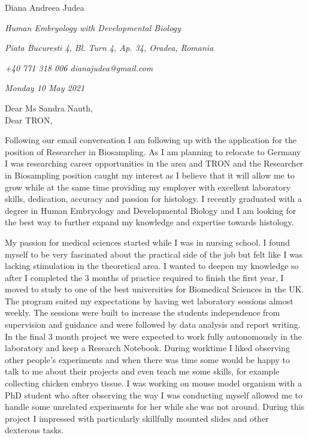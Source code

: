 \documentclass[paper=a4,fontsize=11pt]{scrartcl} %
\newcommand{\sepspace}{\vspace*{1em}}		%
\newcommand{\MyName}[1]{ %
  \Huge \usefont{OT1}{phv}{b}{n} \hfill #1
  \par \normalsize \normalfont}
\newcommand{\MyCoverSlogan}[4]{ %
  \large \usefont{OT1}{phv}{m}{n}\hfill \textit{#1} 
  \sepspace
  \par \normalsize \usefont{OT1}{phv}{m}{n}\hfill \textit{#2}
  \par \normalsize \usefont{OT1}{phv}{m}{n}\hfill \textit{#3}
  \par \normalsize \usefont{OT1}{phv}{m}{n}\hfill \textit{#4}
  \par \normalsize \normalfont}
\begin{document}
  
  \MyName{Diana Andreea Judea}
  \MyCoverSlogan{Human Embryology with Developmental Biology}{Piata Bucuresti 4, Bl.  Turn 4, Ap.  34, Oradea, Romania}{+40 771 318 006 \hspace{5pt} dianajudea@gmail.com}{Monday 10 May 2021}
  \sepspace %
  
  \noindent
  Dear Ms Sandra Nauth, \\
  Dear TRON,

  \sepspace 

  \noindent Following our email conversation I am following up with the
  application for the position of Researcher in Biosampling.  As I am planning
  to relocate to Germany I was researching career opportunities in the area and
  TRON and the Researcher in Biosampling position caught my interest as I
  believe that it will allow me to grow while at the same time providing my
  employer with excellent laboratory skills, dedication, accuracy and passion
  for histology.  I recently graduated with a degree in Human Embryology and
  Developmental Biology and I am looking for the best way to further expand my
  knowledge and expertise towards histology.

  \sepspace 

  \noindent My passion for medical sciences started while I was in nursing
  school.  I found myself to be very fascinated about the practical side of the
  job but felt like I was lacking stimulation in the theoretical area.  I
  wanted to deepen my knowledge so after I completed the 3 months of practice
  required to finish the first year, I moved to study to one of the best
  universities for Biomedical Sciences in the UK.  The program suited my
  expectations by having wet laboratory sessions almost weekly.  The sessions
  were built to increase the students independence from supervision and
  guidance and were followed by data analysis and report writing.  In the final
  3 month project we were expected to work fully autonomously in the laboratory
  and keep a Research Notebook.  During worktime I liked observing other
  people’s experiments and when there was time some would be happy to talk to
  me about their projects and even teach me some skills, for example
  collecting chicken embryo tissue.  I was working on mouse model organism
  with a PhD student who after observing the way I was conducting myself
  allowed me to handle some unrelated experiments for her while she was not
  around.  During this project I impressed with particularly skillfully
  mounted slides and other dexterous tasks.
\end{document}
